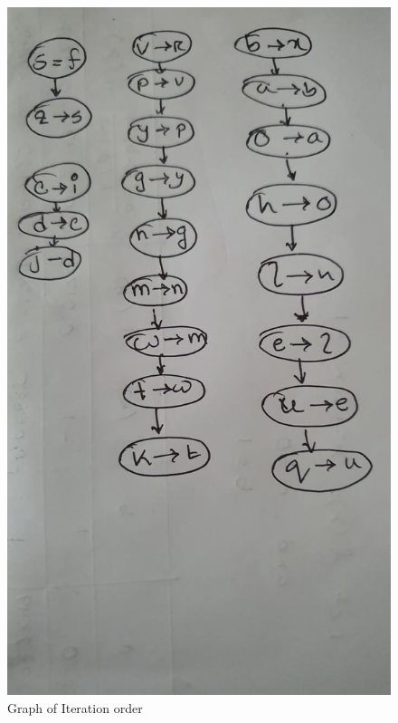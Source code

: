 \documentclass[12pt]{report}
\begin{document}
{\begin{figure}
  \includegraphics[scale=0.4]{graph.jpg}
  \caption{Graph of Iteration order}
  \label{fig:graph1}
\end{figure}

}
\end{document}
